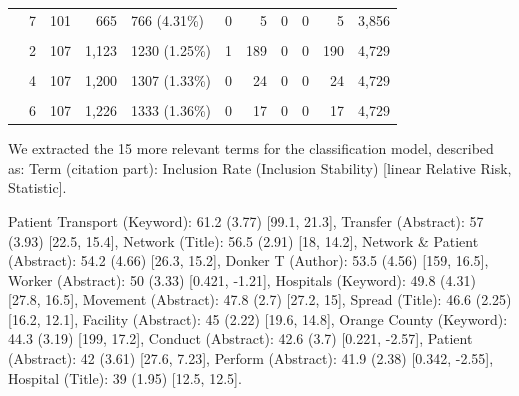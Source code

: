 \documentclass{article}
\begin{document}
\begin{table}[!h]
{\begin{tabular}[t]{llrrlrrrrrr}
 & 7 & 101 & 665 & 766 (4.31\%) & 0 & 5 & 0 & 0 & 5 & 3,856\\
\cellcolor{gray!6}{Session2 (n = 98371)} & \cellcolor{gray!6}{1} & \cellcolor{gray!6}{106} & \cellcolor{gray!6}{934} & \cellcolor{gray!6}{1040 (1.06\%)} & \cellcolor{gray!6}{5} & \cellcolor{gray!6}{270} & \cellcolor{gray!6}{998} & \cellcolor{gray!6}{0} & \cellcolor{gray!6}{1,273} & \cellcolor{gray!6}{4,729}\\
 & 2 & 107 & 1,123 & 1230 (1.25\%) & 1 & 189 & 0 & 0 & 190 & 4,729\\
\addlinespace
\cellcolor{gray!6}{} & \cellcolor{gray!6}{3} & \cellcolor{gray!6}{107} & \cellcolor{gray!6}{1,176} & \cellcolor{gray!6}{1283 (1.3\%)} & \cellcolor{gray!6}{0} & \cellcolor{gray!6}{53} & \cellcolor{gray!6}{0} & \cellcolor{gray!6}{0} & \cellcolor{gray!6}{53} & \cellcolor{gray!6}{4,733}\\
 & 4 & 107 & 1,200 & 1307 (1.33\%) & 0 & 24 & 0 & 0 & 24 & 4,729\\
\cellcolor{gray!6}{} & \cellcolor{gray!6}{5} & \cellcolor{gray!6}{107} & \cellcolor{gray!6}{1,209} & \cellcolor{gray!6}{1316 (1.34\%)} & \cellcolor{gray!6}{0} & \cellcolor{gray!6}{9} & \cellcolor{gray!6}{0} & \cellcolor{gray!6}{0} & \cellcolor{gray!6}{9} & \cellcolor{gray!6}{4,729}\\
 & 6 & 107 & 1,226 & 1333 (1.36\%) & 0 & 17 & 0 & 0 & 17 & 4,729\\
\bottomrule
\end{tabular}}
\end{table}

We extracted the 15 more relevant terms for the classification model,
described as: Term (citation part): Inclusion Rate (Inclusion Stability)
{[}linear Relative Risk, Statistic{]}.

Patient Transport (Keyword): 61.2 (3.77) {[}99.1, 21.3{]}, Transfer
(Abstract): 57 (3.93) {[}22.5, 15.4{]}, Network (Title): 56.5 (2.91)
{[}18, 14.2{]}, Network \& Patient (Abstract): 54.2 (4.66) {[}26.3,
15.2{]}, Donker T (Author): 53.5 (4.56) {[}159, 16.5{]}, Worker
(Abstract): 50 (3.33) {[}0.421, -1.21{]}, Hospitals (Keyword): 49.8
(4.31) {[}27.8, 16.5{]}, Movement (Abstract): 47.8 (2.7) {[}27.2, 15{]},
Spread (Title): 46.6 (2.25) {[}16.2, 12.1{]}, Facility (Abstract): 45
(2.22) {[}19.6, 14.8{]}, Orange County (Keyword): 44.3 (3.19) {[}199,
17.2{]}, Conduct (Abstract): 42.6 (3.7) {[}0.221, -2.57{]}, Patient
(Abstract): 42 (3.61) {[}27.6, 7.23{]}, Perform (Abstract): 41.9 (2.38)
{[}0.342, -2.55{]}, Hospital (Title): 39 (1.95) {[}12.5, 12.5{]}.
\end{document}
